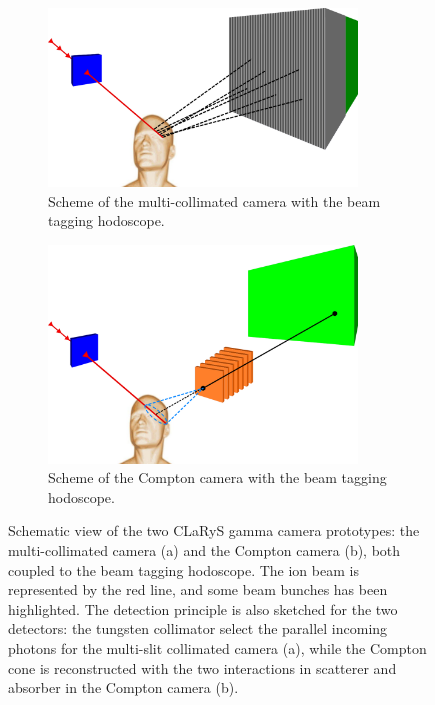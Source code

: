 \begin{figure}
\begin{subfigure}[b]{.5\textwidth}
\centering
\includegraphics[width=0.9\textwidth]{03_GraphicFiles/chapter3_CLaRySproto/schemes/scheme_CollC.png}
\caption{Scheme of the multi-collimated camera with the beam tagging hodoscope.}
\label{chap3::subfig::multiCollScheme}
\end{subfigure}
\begin{subfigure}[b]{.5\textwidth}
\centering
\includegraphics[width=0.9\textwidth]{03_GraphicFiles/chapter3_CLaRySproto/schemes/scheme_CC.png}	
\caption{Scheme of the Compton camera with the beam tagging hodoscope.}
\label{chap3::subfig::ComptonScheme}
\end{subfigure}
\caption{Schematic view of the two CLaRyS gamma camera prototypes: the multi-collimated camera (a) and the Compton camera (b), both coupled to the beam tagging hodoscope. The ion beam is represented by the red line, and some beam bunches has been highlighted. The detection principle is also sketched for the two detectors: the tungsten collimator select the parallel incoming photons for the multi-slit collimated camera (a), while the Compton cone is reconstructed with the two interactions in scatterer and absorber in the Compton camera (b).}
\label{chap3::fig::camerasScheme}
\end{figure}
 

